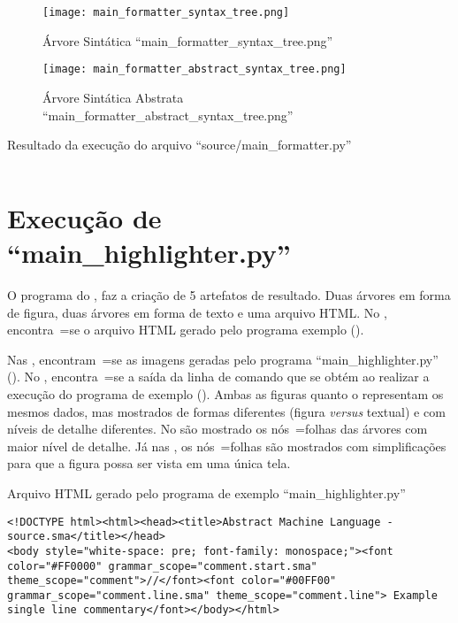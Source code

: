 \begin{figure}[!htb]
\caption{Árvore Sintática ``main\_formatter\_syntax\_tree.png''}
\label{figure:MainFormatterSyntaxTree}
\centering
\texttt{[image: main\_formatter\_syntax\_tree.png]}
\end{figure}

\begin{figure}[!htb]
\caption{Árvore Sintática Abstrata ``main\_formatter\_abstract\_syntax\_tree.png''}
\label{figure:MainFormatterAbstractSyntaxTree}
\centering
\texttt{[image: main\_formatter\_abstract\_syntax\_tree.png]}
\end{figure}

\begin{code}
\caption{Resultado da execução do arquivo ``source/main\_formatter.py''}
\label{code:MainFormatterPyResult}
\inputminted{text}{aftertext/main_formatter_output.txt}
\end{code}


\chapter[main\_highlighter.py]{Execução de ``main\_highlighter.py''}

O programa do ,
faz a criação de 5 artefatos de resultado.
Duas árvores em forma de figura,
duas árvores em forma de texto e
uma arquivo HTML.
No ,
encontra~=se o arquivo HTML gerado pelo programa exemplo ().

Nas ,
encontram~=se as imagens geradas pelo programa ``main\_highlighter.py'' ().
No ,
encontra~=se a saída da linha de comando que se obtém ao realizar a execução do programa de exemplo ().
Ambas as figuras  quanto o  representam os mesmos dados,
mas mostrados de formas diferentes (figura \textit{versus} textual) e
com níveis de detalhe diferentes.
No  são mostrado os nós~=folhas das árvores com maior nível de detalhe.
Já nas ,
os nós~=folhas são mostrados com simplificações para que a figura possa ser vista em uma única tela.
\begin{code}
\caption{Arquivo HTML gerado pelo programa de exemplo ``main\_highlighter.py''}
\label{code:MainHighlighterHtml}
\begin{verbatim}
<!DOCTYPE html><html><head><title>Abstract Machine Language - source.sma</title></head>
<body style="white-space: pre; font-family: monospace;"><font color="#FF0000" grammar_scope="comment.start.sma" theme_scope="comment">//</font><font color="#00FF00" grammar_scope="comment.line.sma" theme_scope="comment.line"> Example single line commentary</font></body></html>
\end{verbatim}
\end{code}

